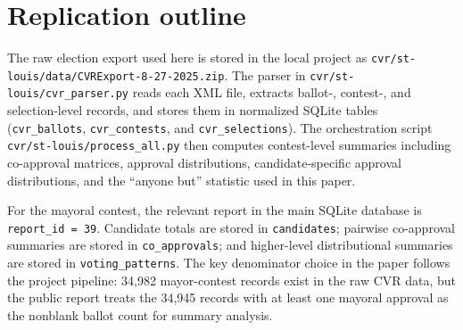 \documentclass[11pt]{article}
\begin{document}
\appendix
\section{Replication outline}
The raw election export used here is stored in the local project as \texttt{cvr/st-louis/data/CVRExport-8-27-2025.zip}. The parser in \texttt{cvr/st-louis/cvr\_parser.py} reads each XML file, extracts ballot-, contest-, and selection-level records, and stores them in normalized SQLite tables (\texttt{cvr\_ballots}, \texttt{cvr\_contests}, and \texttt{cvr\_selections}). The orchestration script \texttt{cvr/st-louis/process\_all.py} then computes contest-level summaries including co-approval matrices, approval distributions, candidate-specific approval distributions, and the ``anyone but'' statistic used in this paper.

For the mayoral contest, the relevant report in the main SQLite database is \texttt{report\_id = 39}. Candidate totals are stored in \texttt{candidates}; pairwise co-approval summaries are stored in \texttt{co\_approvals}; and higher-level distributional summaries are stored in \texttt{voting\_patterns}. The key denominator choice in the paper follows the project pipeline: 34,982 mayor-contest records exist in the raw CVR data, but the public report treats the 34,945 records with at least one mayoral approval as the nonblank ballot count for summary analysis.



\end{document}
